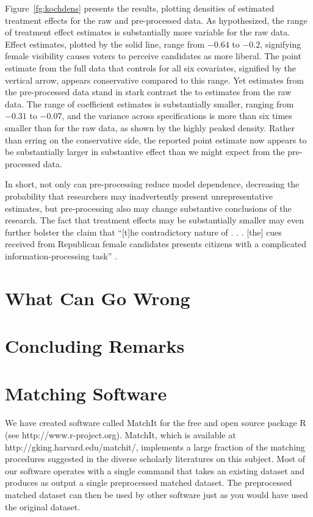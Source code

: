 \documentclass[11pt,titlepage]{article}
\begin{document}
Figure~\ref{fg:kochdens} presents the results, plotting densities of
estimated treatment effects for the raw and pre-processed data.  As
hypothesized, the range of treatment effect estimates is substantially
more variable for the raw data.  Effect estimates, plotted by the
solid line, range from $-0.64$ to $-0.2$, signifying female visibility
causes voters to perceive candidates as more liberal.  The point
estimate from the full data that controls for all six covariates,
signified by the vertical arrow, appears conservative compared to this
range.  Yet estimates from the pre-processed data stand in stark
contrast the to estimates from the raw data.  The range of coefficient
estimates is substantially smaller, ranging from $-0.31$ to $-0.07$,
and the variance across specifications is more than six times smaller
than for the raw data, as shown by the highly peaked density.  Rather
than erring on the conservative side, the reported point estimate now
appears to be substantially larger in substantive effect than we might
expect from the pre-processed data.

In short, not only can pre-processing reduce model dependence,
decreasing the probability that researchers may inadvertently present
unrepresentative estimates, but pre-processing also may change
substantive conclusions of the research.  The fact that treatment
effects may be substantially smaller may even further bolster the
claim that ``[t]he contradictory nature of . . . [the] cues received
from Republican female candidates presents citizens with a complicated
information-processing task'' \citep[p. 460]{koch:02}.

\section{What Can Go Wrong}

\section{Concluding Remarks}

\appendix
\section{Matching Software}

We have created software called MatchIt for the free and open source
package R (see http://www.r-project.org).  MatchIt, which is available
at http://gking.harvard.edu/matchit/, implements a large fraction of
the matching procedures suggested in the diverse scholarly literatures
on this subject.  Most of our software operates with a single command
that takes an existing dataset and produces as output a single
preprocessed matched dataset.  The preprocessed matched dataset can
then be used by other software just as you would have used the
original dataset.
\end{document}

